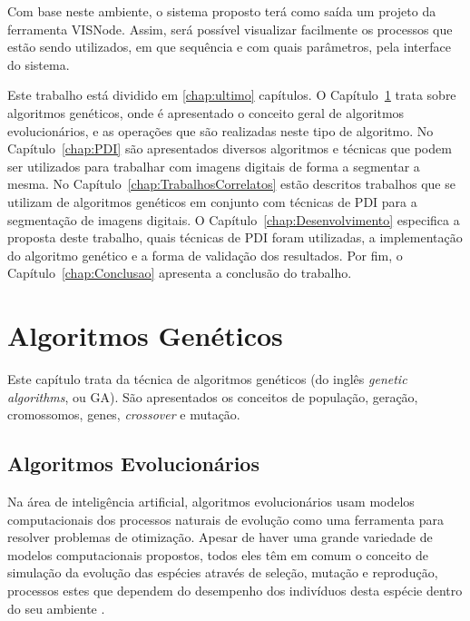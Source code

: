 \documentclass[12pt,oneside,a4paper,english,french,spanish,brazil,]{abntex2}
\begin{document}
Com base neste ambiente, o sistema proposto terá como saída um projeto da ferramenta VISNode. Assim, será possível visualizar facilmente os processos que estão sendo utilizados, em que sequência e com quais parâmetros, pela interface do sistema.

Este trabalho está dividido em \ref{chap:ultimo} capítulos. O Capítulo~\ref{chap:AlgoritmosGeneticos} trata sobre algoritmos genéticos, onde é apresentado o conceito geral de algoritmos evolucionários, e as operações que são realizadas neste tipo de algoritmo. No Capítulo~\ref{chap:PDI} são apresentados diversos algoritmos e técnicas que podem ser utilizados para trabalhar com imagens digitais de forma a segmentar a mesma. No Capítulo~\ref{chap:TrabalhosCorrelatos} estão descritos trabalhos que se utilizam de algoritmos genéticos em conjunto com técnicas de PDI para a segmentação de imagens digitais. O Capítulo~\ref{chap:Desenvolvimento} especifica a proposta deste trabalho, quais técnicas de PDI foram utilizadas, a implementação do algoritmo genético e a forma de validação dos resultados. Por fim, o Capítulo~\ref{chap:Conclusao} apresenta a conclusão do trabalho.

\chapter{Algoritmos Genéticos}
\label{chap:AlgoritmosGeneticos}

Este capítulo trata da técnica de algoritmos genéticos (do inglês \textit{genetic algorithms}, ou GA). São apresentados os conceitos de população, geração, cromossomos, genes, \textit{crossover} e mutação.

\section{Algoritmos Evolucionários}

Na área de inteligência artificial, algoritmos evolucionários usam modelos computacionais dos processos naturais de evolução como uma ferramenta para resolver problemas de otimização. Apesar de haver uma grande variedade de modelos computacionais propostos, todos eles têm em comum o conceito de simulação da evolução das espécies através de seleção, mutação e reprodução, processos estes que dependem do desempenho dos indivíduos desta espécie dentro do seu ambiente \cite{linden:2008}.
\end{document}
